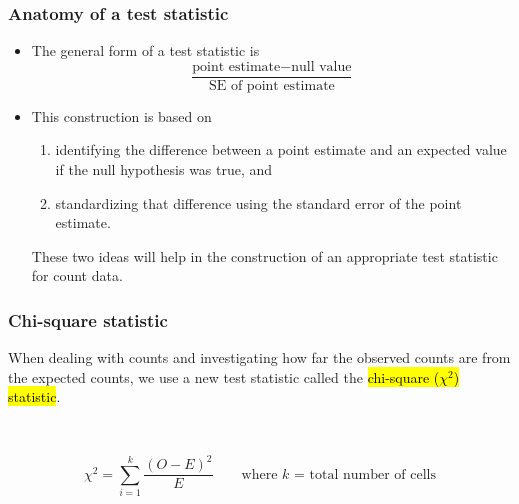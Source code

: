 \documentclass[slidestop,compress,mathserif]{beamer}
\begin{document}

\begin{frame}
\frametitle{Anatomy of a test statistic}

\begin{itemize}

\item The general form of a test statistic is
\[ \frac{\text{point estimate} - \text{null value}}{\text{SE of point estimate}} \]

\pause

\item This construction is based on 
\begin{enumerate}
\item identifying the difference between a point estimate and an expected value if the null hypothesis was true, and 
\item standardizing that difference using the standard error of the point estimate. 
\end{enumerate}
\pause

These two ideas will help in the construction of an appropriate test statistic for count data.

\end{itemize}

\end{frame}


\begin{frame}
\frametitle{Chi-square statistic}

When dealing with counts and investigating how far the observed counts are from the expected counts, we use a new test statistic called the \hl{chi-square ($\chi^2$) statistic}.

$\:$ \\

\pause

{
\[\chi^2 = \sum_{i = 1}^k \frac{(O - E)^2}{E} \qquad \text{where $k$ = total number of cells} \]
}

\end{frame}

\end{document}
